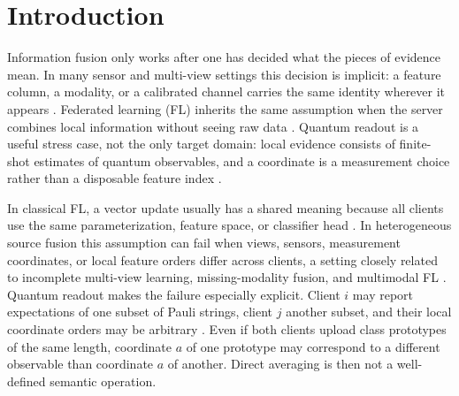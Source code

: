 \documentclass[preprint]{elsarticle}
\begin{document}
\section{Introduction}

Information fusion only works after one has decided what the pieces of evidence mean. In many sensor and multi-view settings this decision is implicit: a feature column, a modality, or a calibrated channel carries the same identity wherever it appears \cite{castanedo2013datafusion,lahat2015multimodal,baltrusaitis2019multimodal,zhao2017multiview}. Federated learning (FL) inherits the same assumption when the server combines local information without seeing raw data \cite{mcmahan2017fedavg,yang2019federated,kairouz2021advances}. Quantum readout is a useful stress case, not the only target domain: local evidence consists of finite-shot estimates of quantum observables, and a coordinate is a measurement choice rather than a disposable feature index \cite{huang2020classicalshadows,hadfield2022locallybiased,bu2024pauli}.

In classical FL, a vector update usually has a shared meaning because all clients use the same parameterization, feature space, or classifier head \cite{mcmahan2017fedavg,kairouz2021advances}. In heterogeneous source fusion this assumption can fail when views, sensors, measurement coordinates, or local feature orders differ across clients, a setting closely related to incomplete multi-view learning, missing-modality fusion, and multimodal FL \cite{havaei2016hemis,tang2024incomplete,cai2024projected,lin2023federatedmultimodal}. Quantum readout makes the failure especially explicit. Client \(i\) may report expectations of one subset of Pauli strings, client \(j\) another subset, and their local coordinate orders may be arbitrary \cite{havlicek2019supervised,schuld2019feature,huang2020classicalshadows}. Even if both clients upload class prototypes of the same length, coordinate \(a\) of one prototype may correspond to a different observable than coordinate \(a\) of another. Direct averaging is then not a well-defined semantic operation.
\end{document}
